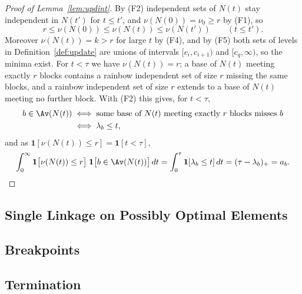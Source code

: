 \begin{proof}[Proof of Lemma~\ref{lem:updint}]
By (F2) independent sets of $N(t)$ stay independent in $N(t')$ for $t\le t'$, and
$\nu(N(0))=\nu_0\ge r$ by (F1), so
\[
  r\le\nu(N(0))\le\nu(N(t))\le\nu(N(t'))\qquad(t\le t').
\]
Moreover $\nu(N(t))=k>r$ for large $t$ by (F4), and by (F5) both sets of levels in
Definition~\ref{def:update} are unions of intervals $[c_i,c_{i+1})$ and
$[c_q,\infty)$, so the minima exist.  For $t<\tau$ we have $\nu(N(t))=r$; a base of
$N(t)$ meeting exactly $r$ blocks contains a rainbow independent set of size $r$
missing the same blocks, and a rainbow independent set of size $r$ extends to a
base of $N(t)$ meeting no further block.  With (F2) this gives, for $t<\tau$,
\[
  \begin{aligned}
  b\in\Av(N(t))&\iff\text{some base of }N(t)\text{ meeting exactly }r\text{ blocks misses }b\\
  &\iff\lambda_b\le t,
  \end{aligned}
\]
and as $\mathbf 1[\nu(N(t))\le r]=\mathbf 1[t<\tau]$,
\[
  \int_0^{\infty}\mathbf 1\bigl[\nu(N(t))\le r\bigr]\;\mathbf 1\bigl[b\in\Av(N(t))\bigr]\,dt
  =\int_0^{\tau}\mathbf 1[\lambda_b\le t]\,dt=(\tau-\lambda_b)_+=a_b.\qedhere
\]
\end{proof}




\subsection{Single Linkage on Possibly Optimal Elements}
\label{app:posl}


\subsection{Breakpoints}
\label{app:events}


\subsection{Termination}
\label{app:term}




